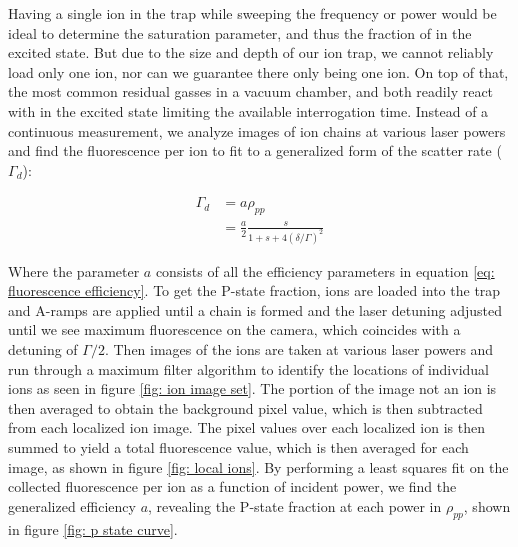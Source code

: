 Having a single ion in the trap while sweeping the frequency or power would be ideal to determine the saturation parameter, and thus the fraction of  in the excited  state. But due to the size and depth of our ion trap, we cannot reliably load only one ion, nor can we guarantee there only being one ion. On top of that, the most common residual gasses in a vacuum chamber,  and  both readily react with  in the excited state limiting the available interrogation time. Instead of a continuous measurement, we analyze images of ion chains at various laser powers and find the fluorescence per ion to fit to a generalized form of the scatter rate ($\Gamma_d$):

\begin{align}
	\Gamma_d & = a \rho_{pp} \nonumber \\
	& = \frac{a}{2}\frac{s}{1+s+4(\delta/\Gamma)^2} \label{eq: fluor fit}
\end{align}

Where the parameter $a$ consists of all the efficiency parameters in equation \ref{eq: fluorescence efficiency}. To get the P-state fraction,  ions are loaded into the trap and A-ramps are applied until a chain is formed and the laser detuning adjusted until we see maximum fluorescence on the camera, which coincides with a detuning of $\Gamma/2$. Then images of the ions are taken at various laser powers and run through a maximum filter algorithm to identify the locations of individual  ions as seen in figure \ref{fig: ion image set}. The portion of the image not an ion is then averaged to obtain the background pixel value, which is then subtracted from each localized ion image. The pixel values over each localized ion is then summed to yield a total fluorescence value, which is then averaged for each image, as shown in figure \ref{fig: local ions}. By performing a least squares fit on the collected fluorescence per ion as a function of incident power, we find the generalized efficiency $a$, revealing the P-state fraction at each power in $\rho_{pp}$, shown in figure \ref{fig: p state curve}.

